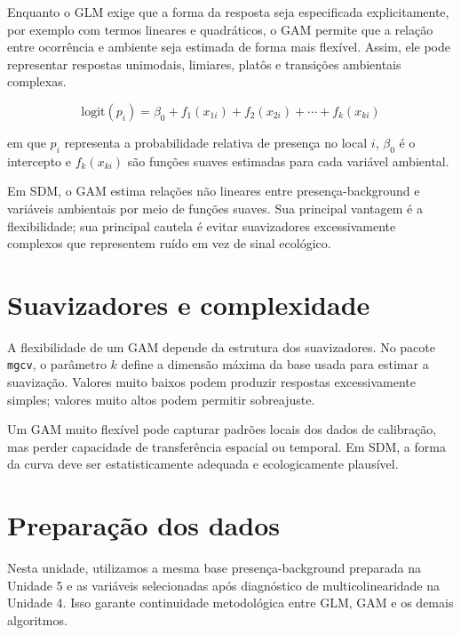\documentclass{ueap-sdm}
\begin{document}
Enquanto o GLM exige que a forma da resposta seja especificada explicitamente, por exemplo com termos lineares e quadráticos, o GAM permite que a relação entre ocorrência e ambiente seja estimada de forma mais flexível. Assim, ele pode representar respostas unimodais, limiares, platôs e transições ambientais complexas.

\begin{equationbox}
	\[
	\text{logit}(p_i) =
	\beta_0 + f_1(x_{1i}) + f_2(x_{2i}) + \cdots + f_k(x_{ki})
	\]
\end{equationbox}

em que \(p_i\) representa a probabilidade relativa de presença no local \(i\), \(\beta_0\) é o intercepto e \(f_k(x_{ki})\) são funções suaves estimadas para cada variável ambiental.

\begin{conceito}[title={\faBook\quad GAM em SDM}]
	Em SDM, o GAM estima relações não lineares entre presença-background e variáveis ambientais por meio de funções suaves. Sua principal vantagem é a flexibilidade; sua principal cautela é evitar suavizadores excessivamente complexos que representem ruído em vez de sinal ecológico.
\end{conceito}

\section{Suavizadores e complexidade}

A flexibilidade de um GAM depende da estrutura dos suavizadores. No pacote \texttt{mgcv}, o parâmetro \(k\) define a dimensão máxima da base usada para estimar a suavização. Valores muito baixos podem produzir respostas excessivamente simples; valores muito altos podem permitir sobreajuste.

\begin{atencao}[title={\faExclamationTriangle\quad Flexibilidade não é sinônimo de qualidade}]
	Um GAM muito flexível pode capturar padrões locais dos dados de calibração, mas perder capacidade de transferência espacial ou temporal. Em SDM, a forma da curva deve ser estatisticamente adequada e ecologicamente plausível.
\end{atencao}

\section{Preparação dos dados}

Nesta unidade, utilizamos a mesma base presença-background preparada na Unidade 5 e as variáveis selecionadas após diagnóstico de multicolinearidade na Unidade 4. Isso garante continuidade metodológica entre GLM, GAM e os demais algoritmos.
\end{document}
